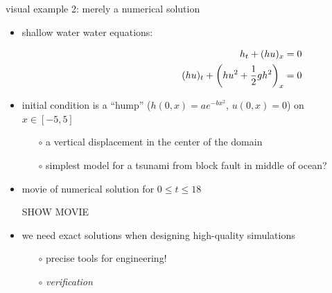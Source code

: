 \documentclass[10pt,hyperref]{beamer}
\begin{document}
\begin{frame}{visual example 2: merely a numerical solution}

\begin{itemize}
\item shallow water water equations:

\vspace{-11.5mm}
\begin{align*}
\hspace{60mm} h_t + (hu)_x &= 0 \\
(hu)_t + \left(h u^2 + \frac{1}{2} g h^2\right)_x &= 0
\end{align*}
\item initial condition is a ``hump'' ($h(0,x)=a e^{-bx^2}$, $u(0,x)=0$) on $x\in[-5,5]$
    \begin{itemize}
    \item[$\circ$] a vertical displacement in the center of the domain
    \item[$\circ$] simplest model for a tsunami from block fault in middle of ocean?
    \end{itemize}
\item movie of numerical solution for $0 \le t \le 18$

\vspace{10mm}
\begin{center}
\alert{SHOW MOVIE}
\end{center}

\vspace{10mm}


\item we need exact solutions when designing high-quality simulations
    \begin{itemize}
    \item[$\circ$] precise tools for engineering!
    \item[$\circ$] \emph{verification}
    \end{itemize}
\end{itemize}
\end{frame}
\end{document}
